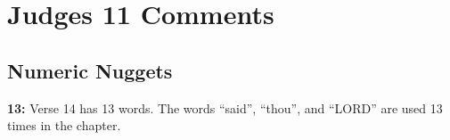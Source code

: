 \section{Judges 11 Comments}

\subsection{Numeric Nuggets}
\textbf{13: } Verse 14 has 13 words. The words ``said'', ``thou'', and ``LORD'' are used 13 times in the chapter.




